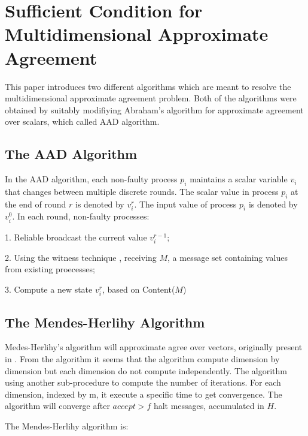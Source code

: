\section{Sufficient Condition for Multidimensional Approximate Agreement}
This paper introduces two different algorithms which are meant to resolve
the multidimensional approximate agreement problem. Both of the algorithms
were obtained by suitably modifiying Abraham's algorithm for approximate
agreement over scalars, which called AAD algorithm\cite{abraham2004optimal}. 

\subsection{The AAD Algorithm}
In the AAD algorithm, each non-faulty process $p_{i}$ maintains a scalar
variable $v_{i}$ that changes between multiple discrete rounds. The scalar
value in process $p_{i}$ at the end of round $r$ is denoted by $v_{i}^{r}$.
The input value of process $p_{i}$ is denoted by $v_{i}^{0}$. In each round,
non-faulty processes\cite{mendes2015multidimensional}:

1. Reliable broadcast the current value $v_{i}^{r-1}$;

2. Using the witness technique , receiving $M$, a message set containing
values from existing proecesses;

3. Compute a new state $v_{i}^{r}$, based on Content($M$)

\subsection{The Mendes-Herlihy Algorithm}
Medes-Herlihy's algorithm will approximate agree over vectors,
originally present in \cite{mendes2013multidimensional}. From the
algorithm it seems that the algorithm compute dimension by dimension
but each dimension do not compute independently. The algorithm using 
another sub-procedure to compute the number of iterations. For each
dimension, indexed by m, it execute a specific time to get convergence.
The algorithm will converge after $accept > f$ halt messages,
accumulated in $H$.

The Mendes-Herlihy algorithm is:

